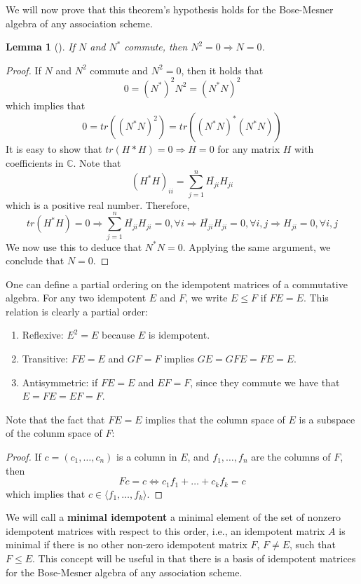 \documentclass[a4paper,12pt]{article}
\theoremstyle{plain}
\newtheorem{lemma}[theorem]{Lemma}
\theoremstyle{definition}
\theoremstyle{remark}
\begin{document}
We will now prove that this theorem's hypothesis holds for the Bose-Mesner algebra
of any association scheme.

\begin{lemma}[{\parencite[Lemma 3.4.2]{godsil_erdoskorado_2015}}]
    If $ N $ and $ N^* $ commute, then $ N^2=0 \Rightarrow N=0 $.
    \label{lm:ekr_N2}
\end{lemma}
\begin{proof}
    If $ N $ and $ N^2 $ commute and $ N^2=0 $, then it holds that
    \[ 0 = (N^*)^2 N^2 = (N^*N)^2 \]
    which implies that
    \[ 0 = tr((N^*N)^2) = tr((N^*N)^*(N^*N)) \]
    It is easy to show that $ tr(H*H) = 0 \Rightarrow H = 0 $ for any matrix $ H $
    with coefficients in $ \mathbb{C} $. Note that
    \[ (H^*H)_{ii} = \sum_{ j=1 }^{ n } \overline{H_{ji}}H_{ji} \]
    which is a positive real number. Therefore,
    \[ tr(H^*H) = 0 \Rightarrow \sum_{ j=1 }^{ n } \overline{H_{ji}}H_{ji} = 0,
        \forall i \Rightarrow \overline{H_{ji}}H_{ji} = 0, \forall i,j
        \Rightarrow H_{ji} = 0, \forall i,j \]
    We now use this to deduce that $ N^*N = 0 $. Applying the same argument, we
    conclude that $ N = 0 $.
\end{proof}

One can define a partial ordering on the idempotent matrices of a commutative
algebra. For any two idempotent $ E $ and $ F $, we write $ E \leq F $ if
$ FE = E $. This relation is clearly a partial order:
\begin{enumerate}
    \item Reflexive: $ E^2 = E $ because $ E $ is idempotent.
    \item Transitive: $ FE = E $ and $ GF = F $ implies $ GE = GFE = FE = E $.
    \item Antisymmetric: if $ FE = E $ and $ EF = F $, since they commute we have
        that $ E = FE = EF = F $.
\end{enumerate}
Note that the fact that $ FE = E $ implies that the column space of $ E $ is
a subspace of the colunm space of $ F $:
\begin{proof}
    If $ c = ( c_1,\dots,c_n) $ is a column in $ E $, and $ f_1, \dots, f_n $
    are the columns of $ F $, then
    \[ Fc = c \iff c_1f_1 + \dots + c_kf_k = c \]
    which implies that $ c \in \langle f_1, \dots, f_k \rangle $.
\end{proof}

We will call a \textbf{minimal idempotent} a minimal element of the set of
nonzero idempotent
matrices with respect to this order, i.e., an idempotent matrix $ A $ is minimal
if there is no other non-zero idempotent matrix $ F $, $ F \neq E $, such that
$ F \leq E $.
This concept will be useful in that there is a basis of idempotent matrices for
the Bose-Mesner algebra of any association scheme.
\end{document}
